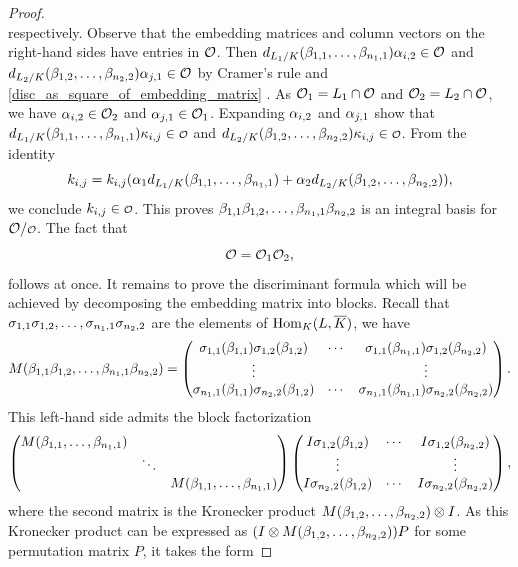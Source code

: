 \begin{proof}
\[      \]
      respectively. Observe that the embedding matrices and column vectors on the right-hand sides have entries in \(\mathcal{O}\). Then \(d_{L_{1}/K}(\beta_{1,1},\ldots,\beta_{n_{1},1})\alpha_{i,2} \in \mathcal{O}\) and \(d_{L_{2}/K}(\beta_{1,2},\ldots,\beta_{n_{2},2})\alpha_{j,1} \in \mathcal{O}\) by Cramer's rule and \cref{disc_as_square_of_embedding_matrix} . As \(\mathcal{O}_{1} = L_{1} \cap \mathcal{O}\) and \(\mathcal{O}_{2} = L_{2} \cap \mathcal{O}\), we have \(\alpha_{i,2} \in \mathcal{O}_{2}\) and \(\alpha_{j,1} \in \mathcal{O}_{1}\). Expanding \(\alpha_{i,2}\) and \(\alpha_{j,1}\) show that \(d_{L_{1}/K}(\b_{1,1},\ldots,\b_{n_{1},1})\k_{i,j} \in \smc{O}\) and \(d_{L_{2}/K}(\b_{1,2},\ldots,\b_{n_{2},2})\k_{i,j} \in \smc{O}\). From the identity
      \[
        k_{i,j} = k_{i,j}(\alpha_{1}d_{L_{1}/K}(\beta_{1,1},\ldots,\beta_{n_{1},1})+\alpha_{2}d_{L_{2}/K}(\beta_{1,2},\ldots,\beta_{n_{2},2})),
      \]
      we conclude \(k_{i,j} \in \smc{O}\). This proves \(\beta_{1,1}\beta_{1,2},\ldots,\beta_{n_{1},1}\beta_{n_{2},2}\) is an integral basis for \(\mc{O}/\smc{O}\). The fact that
      \[
        \mathcal{O} =\mathcal{O}_{1}\mathcal{O}_{2},
      \]
      follows at once. It remains to prove the discriminant formula which will be achieved by decomposing the embedding matrix into blocks. Recall that \(\sigma_{1,1}\sigma_{1,2},\ldots,\sigma_{n_{1},1}\sigma_{n_{2},2}\) are the elements of \(\operatorname{\mathrm{Hom}}_{K}(L,\overline{K})\), we have
      \[
        M(\beta_{1,1}\beta_{1,2},\ldots,\beta_{n_{1},1}\beta_{n_{2},2}) = \begin{pmatrix} \sigma_{1,1}(\beta_{1,1})\sigma_{1,2}(\beta_{1,2}) & \cdots & \sigma_{1,1}(\beta_{n_{1},1})\sigma_{1,2}(\beta_{n_{2},2}) \\ \vdots & & \vdots \\ \sigma_{n_{1},1}(\beta_{1,1})\sigma_{n_{2},2}(\beta_{1,2}) & \cdots & \sigma_{n_{1},1}(\beta_{n_{1},1})\sigma_{n_{2},2}(\beta_{n_{2},2}) \end{pmatrix}.
      \]
      This left-hand side admits the block factorization
      \[
        \begin{pmatrix} M(\beta_{1,1},\ldots,\beta_{n_{1},1}) & & \\ & \ddots & \\ & & M(\beta_{1,1},\ldots,\beta_{n_{1},1}) \end{pmatrix}\begin{pmatrix} I\sigma_{1,2}(\beta_{1,2}) & \cdots & I\sigma_{1,2}(\beta_{n_{2},2}) \\ \vdots & & \vdots \\ I\sigma_{n_{2},2}(\beta_{1,2}) & \cdots & I\sigma_{n_{2},2}(\beta_{n_{2},2}) \end{pmatrix},
      \]
      where the second matrix is the Kronecker product \(M(\beta_{1,2},\ldots,\beta_{n_{2},2}) \otimes I\). As this Kronecker product can be expressed as \((I \otimes M(\beta_{1,2},\ldots,\beta_{n_{2},2}))P\) for some permutation matrix \(P\), it takes the form

\end{proof}
